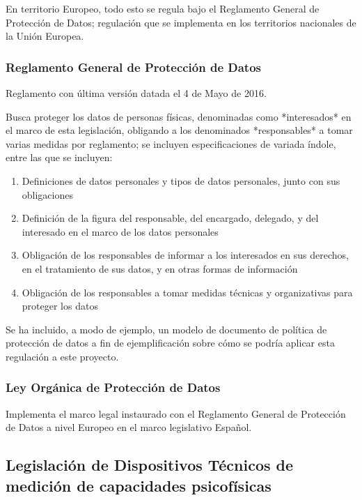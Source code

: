 \documentclass[12pt,a4paper,twoside,openright]{book}
\begin{document}
En territorio Europeo, todo esto se regula bajo el Reglamento General de Protección de Datos; regulación que se implementa en los territorios nacionales de la Unión Europea. \cite{apuntesprotecciondatos}

\subsubsection{Reglamento General de Protección de Datos}

Reglamento con última versión datada el 4 de Mayo de 2016. \cite{EuropeanParliament2016a}

Busca proteger los datos de personas físicas, denominadas como *interesados* en el marco de esta legislación, obligando a los denominados *responsables* a tomar varias medidas por reglamento; se incluyen especificaciones de variada índole, entre las que se incluyen:
\begin{enumerate}
  \item Definiciones de datos personales y tipos de datos personales, junto con sus obligaciones
  \item Definición de la figura del responsable, del encargado, delegado, y del interesado en el marco de los datos personales
  \item Obligación de los responsables de informar a los interesados en sus derechos, en el tratamiento de sus datos, y en otras formas de información
  \item Obligación de los responsables a tomar medidas técnicas y organizativas para proteger los datos
\end{enumerate}

Se ha incluido, a modo de ejemplo, un modelo de documento de política de protección de datos a fin de ejemplificación sobre cómo se podría aplicar esta regulación a este proyecto.

\subsubsection{Ley Orgánica de Protección de Datos}

Implementa el marco legal instaurado con el Reglamento General de Protección de Datos a nivel Europeo en el marco legislativo Español. \cite{BOE2018a}

\subsection{Legislación de Dispositivos Técnicos de medición de capacidades psicofísicas}
\end{document}
